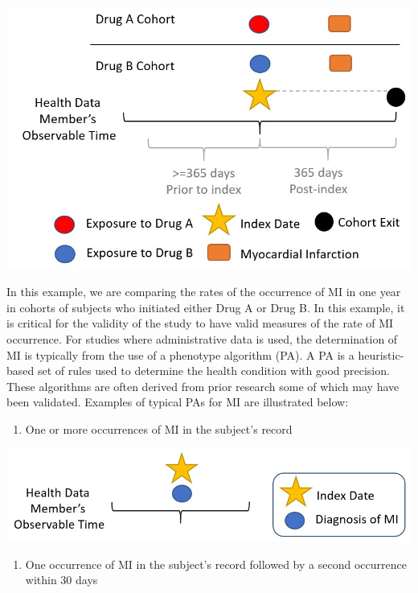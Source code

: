 \documentclass[11pt]{book}
\providecommand{\tightlist}{%
  \setlength{\itemsep}{0pt}\setlength{\parskip}{0pt}}
\theoremstyle{definition}
\theoremstyle{definition}
\theoremstyle{definition}
\theoremstyle{remark}
\begin{document}
\begin{center}\includegraphics[width=0.75\linewidth]{images/ClinicalValidity/figure1} \end{center}

In this example, we are comparing the rates of the occurrence of MI in one year in cohorts of subjects who initiated either Drug A or Drug B. In this example, it is critical for the validity of the study to have valid measures of the rate of MI occurrence. For studies where administrative data is used, the determination of MI is typically from the use of a phenotype algorithm (PA). A PA is a heuristic-based set of rules used to determine the health condition with good precision. These algorithms are often derived from prior research some of which may have been validated. Examples of typical PAs for MI are illustrated below: 

\begin{enumerate}
\def\labelenumi{\arabic{enumi})}
\tightlist
\item
  One or more occurrences of MI in the subject's record
\end{enumerate}

\begin{center}\includegraphics[width=0.75\linewidth]{images/ClinicalValidity/figure2} \end{center}

\begin{enumerate}
\def\labelenumi{\arabic{enumi})}
\setcounter{enumi}{1}
\tightlist
\item
  One occurrence of MI in the subject's record followed by a second occurrence within 30 days
\end{enumerate}
\end{document}
